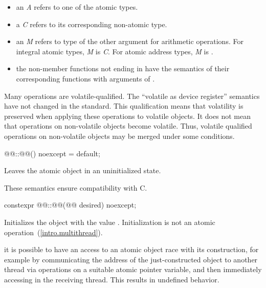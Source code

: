 \begin{itemize}
\item  an \textit{A} refers to one of the atomic types.
\item a \textit{C} refers to its corresponding non-atomic type.
\item an \textit{M} refers to type of the other argument for arithmetic operations. For
integral atomic types, \textit{M} is \textit{C}. For atomic address types, \textit{M} is
.
\item the non-member functions not ending in  have the semantics of their
corresponding  functions with  arguments of
.
\end{itemize}

\pnum
\begin{note} Many operations are volatile-qualified. The ``volatile as device register''
semantics have not changed in the standard. This qualification means that volatility is
preserved when applying these operations to volatile objects. It does not mean that
operations on non-volatile objects become volatile. Thus, volatile qualified operations
on non-volatile objects may be merged under some conditions. \end{note}

%
\begin{itemdecl}
@@::@@() noexcept = default;
\end{itemdecl}

\begin{itemdescr}
\pnum
\effects
Leaves the atomic object in an uninitialized state.
\begin{note}
These semantics ensure compatibility with C.
\end{note}
\end{itemdescr}

%
\begin{itemdecl}
constexpr @@::@@(@@ desired) noexcept;
\end{itemdecl}

\begin{itemdescr}
\pnum
\effects Initializes the object with the value .
Initialization is not an atomic operation~(\ref{intro.multithread}).
\begin{note} it is possible to have an access to an atomic object 
race with its construction, for example by communicating the address of the
just-constructed object  to another thread via
 operations on a suitable atomic pointer
variable, and then immediately accessing  in the receiving thread.
This results in undefined behavior. \end{note}
\end{itemdescr}

